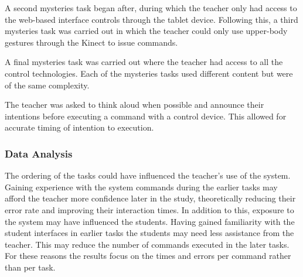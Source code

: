\documentclass[link]{IWCOMP}
\begin{document}
A second mysteries task began after, during which the teacher only had access to the web-based interface controls through the tablet device.
Following this, a third mysteries task was carried out in which the teacher could only use upper-body gestures through the Kinect to issue commands.

A final mysteries task was carried out where the teacher had access to all the control technologies.  
Each of the mysteries tasks used different content but were of the same complexity.  

The teacher was asked to think aloud when possible and announce their intentions before executing a command with a control device.  
This allowed for accurate timing of intention to execution.

\subsubsection{Data Analysis}
\label{subsubsec:pilotStudyAnalysis}

The ordering of the tasks could have influenced the teacher's use of the system.
Gaining experience with the system commands during the earlier tasks may afford the teacher more confidence later in the study, theoretically reducing their error rate and improving their interaction times.
In addition to this, exposure to the system may have influenced the students.
Having gained familiarity with the student interfaces in earlier tasks the students may need less assistance from the teacher.
This may reduce the number of commands executed in the later tasks.
For these reasons the results focus on the times and errors per command rather than per task.
\end{document}
